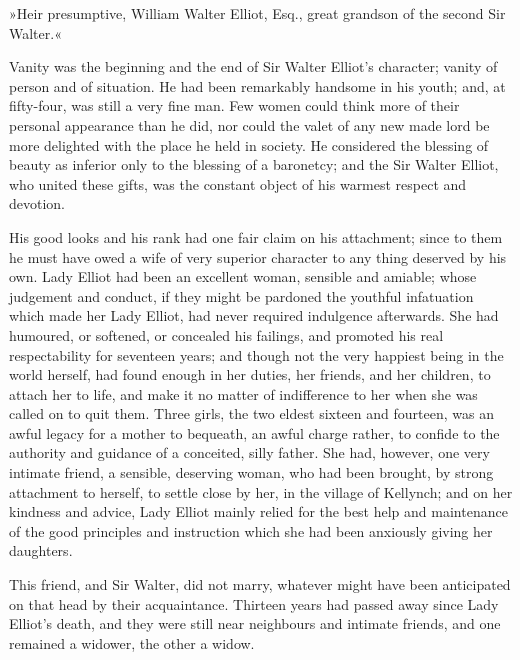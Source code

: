 »Heir presumptive, William Walter Elliot, Esq., great grandson of the second Sir Walter.«

Vanity was the beginning and the end of Sir Walter Elliot's character; vanity of person and of situation. He had been remarkably handsome in his youth; and, at fifty-four, was still a very fine man. Few women could think more of their personal appearance than he did, nor could the valet of any new made lord be more delighted with the place he held in society. He considered the blessing of beauty as inferior only to the blessing of a baronetcy; and the Sir Walter Elliot, who united these gifts, was the constant object of his warmest respect and devotion.

His good looks and his rank had one fair claim on his attachment; since to them he must have owed a wife of very superior character to any thing deserved by his own. Lady Elliot had been an excellent woman, sensible and amiable; whose judgement and conduct, if they might be pardoned the youthful infatuation which made her Lady Elliot, had never required indulgence afterwards. She had humoured, or softened, or concealed his failings, and promoted his real respectability for seventeen years; and though not the very happiest being in the world herself, had found enough in her duties, her friends, and her children, to attach her to life, and make it no matter of indifference to her when she was called on to quit them. Three girls, the two eldest sixteen and fourteen, was an awful legacy for a mother to bequeath, an awful charge rather, to confide to the authority and guidance of a conceited, silly father. She had, however, one very intimate friend, a sensible, deserving woman, who had been brought, by strong attachment to herself, to settle close by her, in the village of Kellynch; and on her kindness and advice, Lady Elliot mainly relied for the best help and maintenance of the good principles and instruction which she had been anxiously giving her daughters.

This friend, and Sir Walter, did not marry, whatever might have been anticipated on that head by their acquaintance. Thirteen years had passed away since Lady Elliot's death, and they were still near neighbours and intimate friends, and one remained a widower, the other a widow.

